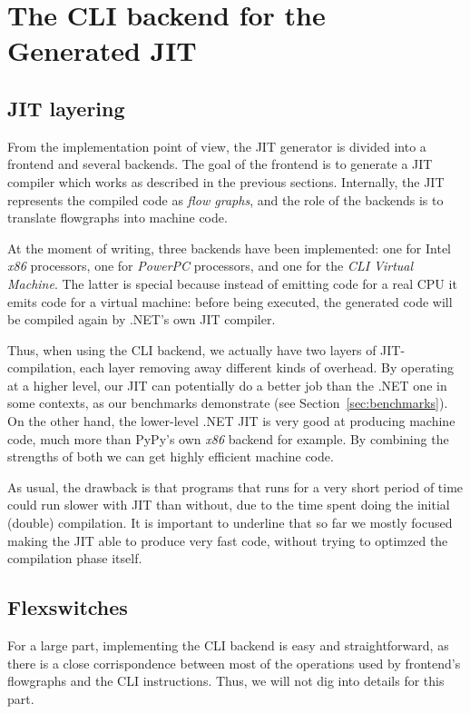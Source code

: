 \section{The CLI backend for the Generated JIT}
\label{sec:clibackend}

\subsection{JIT layering}


From the implementation point of view, the JIT generator is divided into a
frontend and several backends.  The goal of the frontend is to generate a JIT
compiler which works as described in the previous sections.  Internally, the
JIT represents the compiled code as \emph{flow graphs}, and the role of
the backends is to translate flowgraphs into machine code.

At the moment of writing, three backends have been implemented: one for Intel
\emph{x86} processors, one for \emph{PowerPC} processors, and one for the
\emph{CLI Virtual Machine}.  The latter is special because instead of emitting
code for a real CPU it emits code for a virtual machine: before being
executed, the generated code will be compiled again by .NET's own JIT
compiler.

Thus, when using the CLI backend, we actually have two layers of
JIT-compilation, each layer removing away different kinds of overhead.  By
operating at a higher level, our JIT can potentially do a better job than the
.NET one in some contexts, as our benchmarks demonstrate (see
Section~\ref{sec:benchmarks}).  On the other hand, the lower-level .NET JIT is
very good at producing machine code, much more than PyPy's own \emph{x86}
backend for example.  By combining the strengths of both we can get highly
efficient machine code.

As usual, the drawback is that programs that runs for a very short period of
time could run slower with JIT than without, due to the time spent doing the
initial (double) compilation.  It is important to underline that so far we
mostly focused making the JIT able to produce very fast code, without trying
to optimzed the compilation phase itself.

\subsection{Flexswitches}

For a large part, implementing the CLI backend is easy and straightforward, as
there is a close corrispondence between most of the operations used by
frontend's flowgraphs and the CLI instructions.  Thus, we will not dig into
details for this part.

